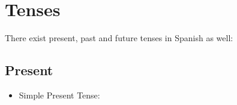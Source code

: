 \documentclass[a4paper,12pt]{article}
\begin{document}
\section{Tenses}

There exist present, past and future tenses in Spanish as well:


\subsection{Present}

\begin{itemize}
\item Simple Present Tense:

\end{itemize}


\appendix

\printindex %
\end{document}
